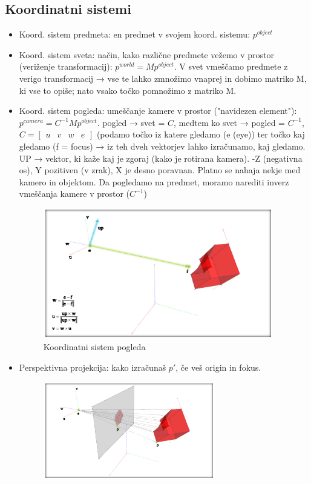 \documentclass{article}
\begin{document}
\subsection{Koordinatni sistemi}
\begin{itemize}
    \item Koord. sistem predmeta: en predmet v svojem koord. sistemu: $p^{object}$
    \item Koord. sistem sveta: način, kako različne predmete vežemo v prostor (veriženje transformacij): $p^{world} = Mp^{object}$. V svet vmeščamo predmete z verigo transformacij → vse te lahko zmnožimo vnaprej in dobimo matriko M, ki vse to opiše; nato vsako točko pomnožimo z matriko M.
    \item Koord. sistem pogleda: umeščanje kamere v prostor ("navidezen element"): $p^{camera} = C^{-1}Mp^{object}$. pogled → svet = $C$, medtem ko svet → pogled = $C^{-1}$, $C = \begin{bmatrix} u & v & w & e \end{bmatrix}$ (podamo točko iz katere gledamo (e (eye)) ter točko kaj gledamo (f = focus) → iz teh dveh vektorjev lahko izračunamo, kaj gledamo. UP → vektor, ki kaže kaj je zgoraj (kako je rotirana kamera). -Z (negativna os), Y pozitiven (v zrak), X je desno poravnan. Platno se nahaja nekje med kamero in objektom. Da pogledamo na predmet, moramo narediti inverz vmeščanja kamere v prostor ($C^{-1}$)
        \begin{figure}[H]
        \centering
        \includegraphics[width=100mm]{src/koordinatni_sistem_pogleda.png}
        \caption{Koordinatni sistem pogleda}
        \end{figure} 
    \item Perspektivna projekcija: kako izračunaš $p'$, če veš origin in fokus.
        \begin{figure}[H]
        \centering
        \includegraphics[width=75mm]{src/perspektivna_projekcija_koord.png}

\end{figure}
\end{itemize}
\end{document}
